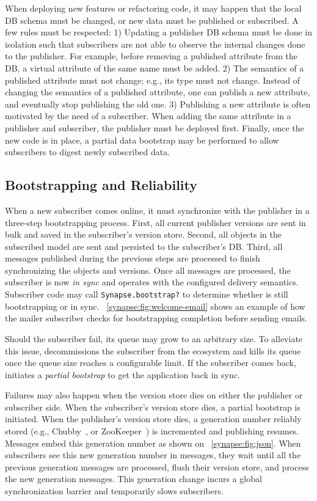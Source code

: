 When deploying new features or refactoring code, it may happen that the local DB
schema must be changed, or new data must be published or subscribed. A few rules
must be respected:
1) Updating a publisher DB schema must be done in isolation such that subscribers
are not able to observe the internal changes done to the publisher. For example,
before removing a published attribute from the DB, a virtual attribute of the
same name must be added.
2) The semantics of a published attribute must not change; e.g., its type must
not change.  Instead of changing the semantics of a published attribute, one can
publish a new attribute, and eventually stop publishing the old one.
3) Publishing a new attribute is often motivated by the need of a subscriber.
When adding the same attribute in a publisher and subscriber, the publisher
must be deployed first.
Finally, once the new code is in place, a partial data bootstrap may be
performed to allow subscribers to digest newly subscribed data.

\subsection{Bootstrapping and Reliability} \label{synapse:sec:arch:bootstrapping}

When a new subscriber comes online, it must synchronize with the publisher in a
three-step bootstrapping process. First, all current publisher versions are sent
in bulk and saved in the subscriber's version store. Second, all objects in the subscribed model are sent and persisted to the subscriber's DB. Third, all messages
published during the previous steps are processed to finish synchronizing the
objects and versions. Once all messages are processed, the subscriber is now
{\em in sync} and operates with the configured delivery semantics.
Subscriber code may call {\tt Synapse.bootstrap?} to determine whether \synapse
is still bootstrapping or in sync. \F~\ref{synapse:fig:welcome-email} shows an example of
how the mailer subscriber checks for bootstrapping completion before sending emails.

Should the subscriber fail, its queue may grow to an arbitrary size. To
alleviate this issue, \synapse decommissions the subscriber from the
\synapse ecosystem and kills its queue once the queue size reaches a
configurable limit. If the subscriber comes back, \synapse initiates a
{\em partial bootstrap} to get the application back in sync.

Failures may also happen when the version store dies on either the publisher or subscriber
side. When the subscriber's version store dies, a partial bootstrap is initiated. When
the publisher's version store dies, a generation number reliably stored (e.g.,
Chubby~\cite{chubby:osdi}, or ZooKeeper~\cite{zookeeper}) is incremented
and publishing resumes. Messages embed this generation number as shown on
\F~\ref{synapse:fig:json}. When subscribers see this new generation number
 in messages, they wait until all the previous generation messages are
processed, flush their version store, and process the new generation messages.
This generation change incurs a global synchronization barrier and
temporarily slows subscribers.


